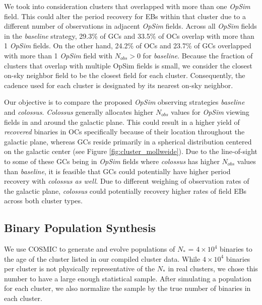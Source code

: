 \documentclass[twocolumn]{aastex63}
\begin{document}
We took into consideration clusters that overlapped with more than one \textit{OpSim} field. This could alter the period recovery for EBs within that cluster due to a different number of observations in adjacent \textit{OpSim} fields. Across all \textit{OpSim} fields in the \textit{baseline} strategy, 29.3\% of GCs and 33.5\% of OCs overlap with more than 1 \textit{OpSim} fields. On the other hand, 24.2\% of OCs and 23.7\% of GCs overlapped with more than 1 \textit{OpSim} field with $N_{obs} > 0$ for \textit{baseline}. Because the fraction of clusters that overlap with multiple OpSim fields is small, we consider the closest on-sky neighbor field to be the closest field for each cluster. Consequently, the cadence used for each cluster is designated by its nearest on-sky neighbor.

Our objective is to compare the proposed \textit{OpSim} observing strategies \textit{baseline} and \textit{colossus}. \textit{Colossus} generally allocates higher $N_{obs}$ values for \textit{OpSim} viewing fields in and around the galactic plane. This could result in a higher yield of \textit{recovered} binaries in OCs specifically because of their location throughout the galactic plane, whereas GCs reside primarily in a spherical distribution centered on the galactic center (see Figure \ref{fig:cluster_mollweide}). Due to the line-of-sight to some of these GCs being in \textit{OpSim} fields where \textit{colossus} has higher $N_{obs}$ values than \textit{baseline}, it is feasible that GCs could potentially have higher period recovery with \textit{colossus as well}. Due to different weighing of observation rates of the galactic plane, \textit{colossus} could potentially recovery higher rates of field EBs across both cluster types.


\subsection{Binary Population Synthesis} \label{subsec:cosmic}
We use COSMIC \citep{2018PhDT........74B} to generate and evolve populations of $N_{*}$ = $4 \times 10^4$ binaries to the age of the cluster listed in our compiled cluster data. While $4 \times 10^4$ binaries per cluster is not physically representative of the $N_{*}$ in real clusters, we chose this number to have a large enough statistical sample. After simulating a population for each cluster, we also normalize the sample by the true number of binaries in  each cluster. 
\end{document}
